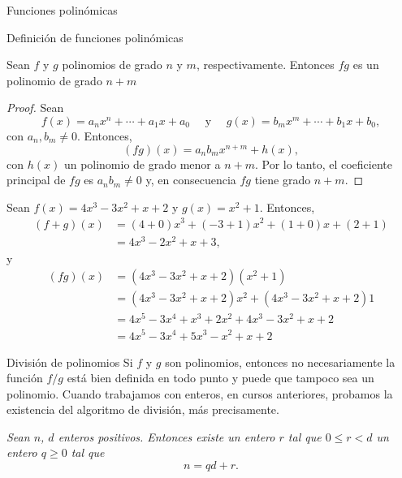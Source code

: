 \begin{chapter}{Funciones polinómicas}
\begin{section}{Definición de funciones polinómicas}
  \begin{proposicion}
      Sean $f$ y $g$ polinomios de grado $n$ y $m$,  respectivamente. Entonces $fg$ es un  polinomio de grado $n+m$
  \end{proposicion}
  \begin{proof}
      Sean
      \begin{equation*}
          f(x) = a_nx^n + \cdots + a_1x +a_0 \quad\text{ y } \quad g(x) = b_mx^m +\cdots + b_1x +b_0,
      \end{equation*}
      con $a_n, b_m \ne 0$. Entonces,
      \begin{equation}
          (fg)(x) = a_nb_m x^{n+m} + h(x),
      \end{equation}
      con $h(x)$ un polinomio de grado menor a $n+m$. Por lo tanto, el coeficiente principal de $fg$ es $a_nb_m \ne 0$ y,  en consecuencia $fg$ tiene grado $n+m$.
  \end{proof}

  \begin{ejemplo*} Sean $f(x) = 4x^3 - 3x^2 + x + 2$ y $g(x) = x^2 + 1$. Entonces,
      \begin{align*}
          (f+g)(x) & = (4+0)x^3 +(-3 +1)x^2 + (1+0)x + (2+1) \\
                   & = 4x^3 - 2x^2 + x + 3,
      \end{align*}
      y
      \begin{align*}
          (fg)(x) & = (4x^3 - 3x^2 + x + 2)(x^2 + 1)                    \\
                  & = (4x^3 - 3x^2 + x + 2)x^2 + (4x^3 - 3x^2 + x + 2)1 \\
                  & = 4x^5 - 3x^4 + x^3 + 2x^2 + 4x^3 - 3x^2 + x + 2    \\
                  & = 4x^5 - 3x^4 + 5x^3 - x^2 + x + 2
      \end{align*}
  \end{ejemplo*}

 \end{section}


 \begin{section}{División de polinomios}\label{seccion-division-de-polinomios} Si $f$ y $g$ son polinomios,  entonces no necesariamente la función $f/g$ está bien definida en todo punto y puede que tampoco sea un polinomio. Cuando trabajamos con enteros, en cursos anteriores,  probamos la existencia del algoritmo de división, más precisamente.

  \textit{Sean $n$, $d$ enteros positivos. Entonces existe un entero $r$ tal que
      $0 \le  r <d$  un entero $q \ge 0$ tal que
  }
  \begin{equation*}
      n = qd + r.
  \end{equation*}


\end{section}
\end{chapter}
